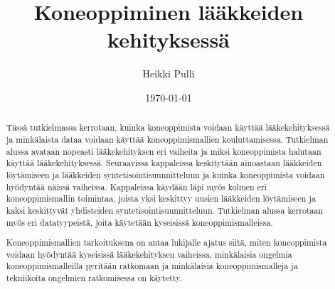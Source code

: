 \documentclass[finnish,twoside,censored,tkt,sw-line]{HYthesisML}
\title{Koneoppiminen lääkkeiden kehityksessä}
\author{Heikki Pulli}
\date{\today}
\begin{document}
\maketitle



\begin{abstract}

    Tässä tutkielmassa kerrotaan, kuinka koneoppimista voidaan käyttää lääkekehityksessä ja minkälaista dataa voidaan käyttää koneoppimismallien kouluttamisessa.
    Tutkielman alussa avataan nopeasti lääkekehityksen eri vaiheita ja miksi koneoppimista halutaan käyttää lääkekehityksessä.
    Seuraavissa kappaleissa keskitytään ainoastaan lääkkeiden löytämiseen ja lääkkeiden syntetisointisuunnitteluun ja kuinka koneoppimista voidaan hyödyntää näissä vaiheissa.
    Kappaleissa käydään läpi myös kolmen eri koneoppimismallin toimintaa, joista yksi keskittyy uusien lääkkeiden löytämiseen ja kaksi keskittyvät yhdisteiden syntetisointisuunnitteluun.
    Tutkielman alussa kerrotaan myös eri datatyypeistä, joita käytetään kyseisissä koneoppimismalleissa.

    Koneoppimismallien tarkoituksena on antaa lukijalle ajatus siitä, miten koneoppimista voidaan hyödyntää kyseisissä lääkekehityksen vaiheissa, minkälaisia ongelmia koneoppimismalleilla pyritään ratkomaan ja minkälaisia koneoppimismalleja ja tekniikoita ongelmien ratkomisessa on käytetty.


\end{abstract}


\end{document}

